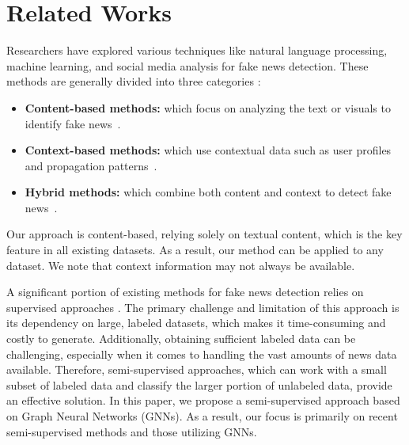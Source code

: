 \section{Related Works}
\label{sec:rw}
Researchers have explored various techniques like natural language processing, machine learning, and social media analysis for fake news detection. 
These methods are generally divided into three categories \cite{lakzaei2024disinformation}:
\begin{itemize}
	\item \textbf{Content-based methods:}
	which focus on analyzing the text or visuals to identify fake news~\cite{lakzaei2024loss}.
	\item \textbf{Context-based methods:}
	which use contextual data such as user profiles and propagation patterns~\cite{DBLP:conf/bigdataconf/AsghariCC22}.
	\item \textbf{Hybrid methods:}
	which combine both content and context to detect fake news~\cite{DAVOUDI2022116635}.
\end{itemize}
Our approach is content-based, relying solely on textual content, which is the key feature in all existing datasets. As a result, our method can be applied to any dataset.
We note that context information may not always be available.

A significant portion of existing methods for fake news detection relies on supervised approaches \cite{yadav2024emotion, qu2024qmfnd, fang2024nsep}.
The primary challenge and limitation of this approach is its dependency on large, labeled datasets, which makes it time-consuming and costly to generate. 
Additionally, obtaining sufficient labeled data can be challenging, especially when it comes to handling the vast amounts of news data available.  
Therefore, semi-supervised approaches, which can work with a small subset of labeled data and classify the larger portion of unlabeled data, provide an effective solution. 
In this paper, we propose a semi-supervised approach based on Graph Neural Networks (GNNs). 
As a result, our focus is primarily on recent semi-supervised methods and those utilizing GNNs.

